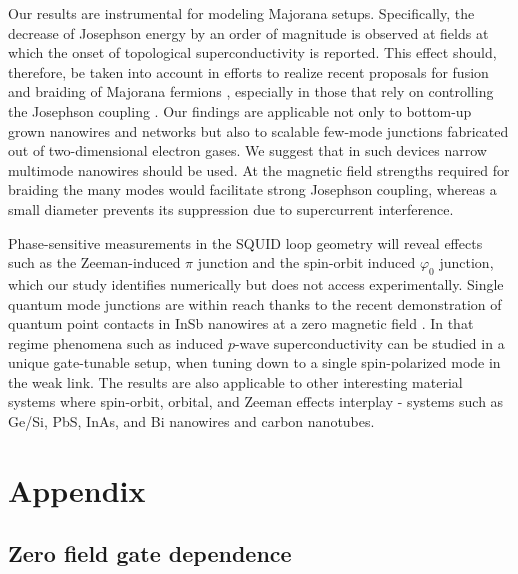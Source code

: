 Our results are instrumental for modeling Majorana setups. 
Specifically, the decrease of Josephson energy by an order of magnitude is observed at fields at which the onset of topological superconductivity is reported. 
This effect should, therefore, be taken into account in efforts to realize recent proposals for fusion and braiding of Majorana fermions \cite{Hyart2013,Aasen2016,Plugge2017,Karzig2017}, especially in those that rely on controlling the Josephson coupling \cite{Hyart2013,Aasen2016,Plugge2017}. 
Our findings are applicable not only to bottom-up grown nanowires and networks but also to scalable few-mode junctions fabricated out of two-dimensional electron gases. \cite{Nichele2017,Lee2017} 
We suggest that in such devices narrow multimode nanowires should be used. 
At the magnetic field strengths required for braiding the many modes would facilitate strong Josephson coupling, whereas a small diameter prevents its suppression due to supercurrent interference.

Phase-sensitive measurements in the SQUID loop geometry will reveal effects  such as the Zeeman-induced  $\pi$ junction and the spin-orbit induced $\varphi_0$ junction, which our study identifies numerically but does not access experimentally. 
Single quantum mode junctions are within reach thanks to the recent demonstration of quantum point contacts in InSb nanowires at a zero magnetic field \cite{Kammhuber2016}. 
In that regime phenomena such as induced $p$-wave superconductivity can be studied in a unique gate-tunable setup, when tuning down to a single spin-polarized mode in the weak link. 
The results are also applicable to other interesting material systems where spin-orbit, orbital,  and Zeeman effects interplay - systems such as Ge/Si, PbS, InAs, and  Bi nanowires and carbon nanotubes. \cite{Cleuziou2006}

\section{Appendix}

\subsection{Zero field gate dependence}

